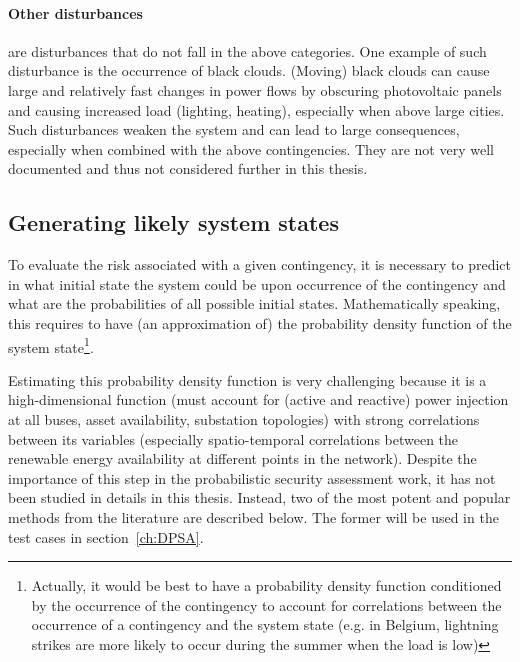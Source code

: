 \paragraph*{Other disturbances} are disturbances that do not fall in the above categories. One example of such disturbance is the occurrence of black clouds. (Moving) black clouds can cause large and relatively fast changes in power flows by obscuring photovoltaic panels and causing increased load (lighting, heating), especially when above large cities. Such disturbances weaken the system and can lead to large consequences, especially when combined with the above contingencies. They are not very well documented and thus not considered further in this thesis.



\subsection{Generating likely system states}
\label{sec:init_state}

To evaluate the risk associated with a given contingency, it is necessary to predict in what initial state the system could be upon occurrence of the contingency and what are the probabilities of all possible initial states. Mathematically speaking, this requires to have (an approximation of) the probability density function of the system state\footnote{Actually, it would be best to have a probability density function conditioned by the occurrence of the contingency to account for correlations between the occurrence of a contingency and the system state (e.g. in Belgium, lightning strikes are more likely to occur during the summer when the load is low)}.

Estimating this probability density function is very challenging because it is a high-dimensional function (must account for (active and reactive) power injection at all buses, asset availability, substation topologies) with strong correlations between its variables (especially spatio-temporal correlations between the renewable energy availability at different points in the network). Despite the importance of this step in the probabilistic security assessment work, it has not been studied in details in this thesis. Instead, two of the most potent and popular methods from the literature are described below. The former will be used in the test cases in section~\ref{ch:DPSA}.

